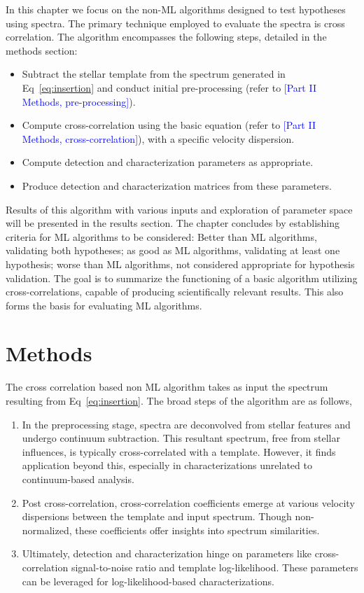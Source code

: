 In this chapter we focus on the non-ML algorithms designed to test hypotheses using spectra. The primary technique employed to evaluate the spectra is cross correlation. The algorithm encompasses the following steps, detailed in the methods section:
\begin{itemize}
    \item 
    Subtract the stellar template from the spectrum generated in Eq~\ref{eq:insertion} and conduct initial pre-processing (refer to \textcolor{blue}{[Part II Methods, pre-processing]}).
    \item
    Compute cross-correlation using the basic equation (refer to \textcolor{blue}{[Part II Methods, cross-correlation]}), with a specific velocity dispersion.
    \item 
    Compute detection and characterization parameters as appropriate.
    \item 
    Produce detection and characterization matrices from these parameters.
\end{itemize}

Results of this algorithm with various inputs and exploration of parameter space will be presented in the results section. The chapter concludes by establishing criteria for ML algorithms to be considered: Better than ML algorithms, validating both hypotheses; as good as ML algorithms, validating at least one hypothesis; worse than ML algorithms, not considered appropriate for hypothesis validation.
The goal is to summarize the functioning of a basic algorithm utilizing cross-correlations, capable of producing scientifically relevant results. This also forms the basis for evaluating ML algorithms.

\section{Methods}
The cross correlation based non ML algorithm takes as input the spectrum resulting from Eq~\ref{eq:insertion}.
The broad steps of the algorithm are as follows,

\begin{enumerate}
    \item In the preprocessing stage, spectra are deconvolved from stellar features and undergo continuum subtraction. This resultant spectrum, free from stellar influences, is typically cross-correlated with a template. However, it finds application beyond this, especially in characterizations unrelated to continuum-based analysis.

\item Post cross-correlation, cross-correlation coefficients emerge at various velocity dispersions between the template and input spectrum. Though non-normalized, these coefficients offer insights into spectrum similarities.

\item Ultimately, detection and characterization hinge on parameters like cross-correlation signal-to-noise ratio and template log-likelihood. These parameters can be leveraged for log-likelihood-based characterizations.
\end{enumerate}
